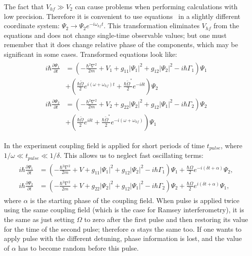 The fact that $V_{hf} \gg V_2$ can cause problems when performing calculations with low precision.
Therefore it is convenient to use equations~
in a slightly different coordinate system:
$\Psi_2 \rightarrow \Psi_2 e^{-i \omega_{hf} t}$.
This transformation eliminates $V_{hf}$ from the equations and does not change single-time observable values;
but one must remember that it does change relative phase of the components,
which may be significant in some cases.
Transformed equations look like:
\begin{align*}
\begin{split}
	i \hbar \frac{\partial \Psi_1}{\partial t} & = \left(
		-\frac{\hbar^2 \nabla^2}{2 m} + V_1
		+ g_{11} \lvert \Psi_1 \rvert^2
		+ g_{12} \lvert \Psi_2 \rvert^2
		- i \hbar \Gamma_1
	\right) \Psi_1 \\
	& + \left(
		\frac{\hbar \tilde{\Omega}}{2} e^{i (\omega + \omega_{hf}) t}
		+ \frac{\hbar \tilde{\Omega}^*}{2} e^{-i \delta t}
	\right) \Psi_2 \\
	i \hbar \frac{\partial \Psi_2}{\partial t} & = \left(
		-\frac{\hbar^2 \nabla^2}{2 m} + V_2
		+ g_{22} \lvert \Psi_2 \rvert^2
		+ g_{12} \lvert \Psi_1 \rvert^2
		- i \hbar \Gamma_2
	\right) \Psi_2 \\
	& + \left(
		\frac{\hbar \tilde{\Omega}}{2} e^{i \delta t}
		+ \frac{\hbar \tilde{\Omega}^*}{2} e^{-i (\omega + \omega_{hf})}
	\right) \Psi_1
\end{split}
\end{align*}

In the experiment coupling field is applied for short periods of time $t_{pulse}$,
where $1 / \omega \ll t_{pulse} \ll 1 / \delta$.
This allows us to neglect fast oscillating terms:
\begin{align}
\label{eqn:mean-field:cgpes_simplified}
\begin{split}
	i \hbar \frac{\partial \Psi_1}{\partial t} & = \left(
		-\frac{\hbar^2 \nabla^2}{2 m} + V
		+ g_{11} \lvert \Psi_1 \rvert^2
		+ g_{12} \lvert \Psi_2 \rvert^2
		- i \hbar \Gamma_1
	\right) \Psi_1
	+ \frac{\hbar \Omega}{2} e^{-i (\delta t + \alpha)} \Psi_2, \\
	i \hbar \frac{\partial \Psi_2}{\partial t} & = \left(
		-\frac{\hbar^2 \nabla^2}{2 m} + V
		+ g_{22} \lvert \Psi_2 \rvert^2
		+ g_{12} \lvert \Psi_1 \rvert^2
		- i \hbar \Gamma_2
	\right) \Psi_2 +
	\frac{\hbar \Omega}{2} e^{i (\delta t + \alpha)} \Psi_1,
\end{split}
\end{align}
where $\alpha$ is the starting phase of the coupling field.
When pulse is applied twice using the same coupling field (which is the case for Ramsey interferometry),
it is the same as just setting $\Omega$ to zero after the first pulse and then restoring its value for the time of the second pulse;
therefore $\alpha$ stays the same too.
If one wants to apply pulse with the different detuning, phase information is lost,
and the value of $\alpha$ has to become random before this pulse.

